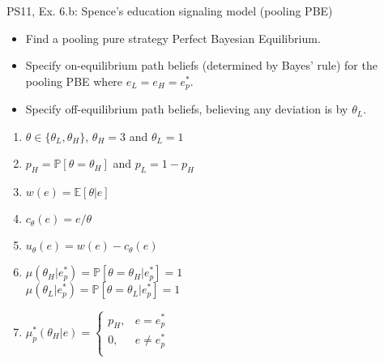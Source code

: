 \begin{frame}{PS11, Ex. 6.b: Spence’s education signaling model (pooling PBE)}
    \begin{itemize}
      \item[(b)] Find a pooling pure strategy Perfect Bayesian Equilibrium.
    \end{itemize}\vspace{-8pt}
    \begin{multicols}{2}
      \begin{itemize}
        \item[Step 1:] Specify on-equilibrium path beliefs (determined by Bayes' rule) for the pooling PBE where $e_L=e_H=e_p^*$.
        \item[Step 2:] Specify off-equilibrium path beliefs, believing any deviation is by $\theta_L$.
      \end{itemize}
      \vfill\null\columnbreak
      \begin{enumerate}
        \item[Types:] $\theta\in\{\theta_L,\theta_H\}$, $\theta_H=3$ and $\theta_L=1$
        \item[Prob.:] $p_H=\mathbb{P}[\theta=\theta_H]$ and $p_L=1-p_H$
        \item[Wage:] $w(e)=\mathbb{E}[\theta|e]$
        \item[Cost:] $c_\theta(e)=e/\theta$
        \item[Utility:] $u_\theta(e)=w(e)-c_\theta(e)$
        \item $\mu\left(\theta_H|e_p^*\right)=
               \mathbb{P}\left[\theta=\theta_H|e_p^*\right]=1$\\
              $\mu\left(\theta_L|e_p^*\right)=
               \mathbb{P}\left[\theta=\theta_L|e_p^*\right]=1$
        \item $\mu_p^*(\theta_H|e)=\left\{\begin{array}{rl}
                  p_H, & e = e_p^* \\
                  0, & e \neq e_p^* \\
               \end{array}\right.$
      \end{enumerate}
    \end{multicols}
    \vfill\null
\end{frame}
